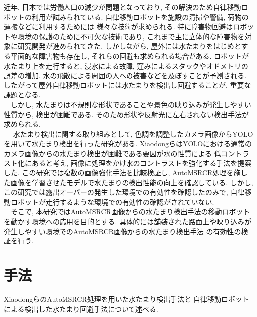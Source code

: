 \documentclass[10pt]{jarticle}
\begin{document}
    近年, 日本では労働人口の減少が問題となっており, 
    その解決のため自律移動ロボットの利用が試みられている. 
    自律移動ロボットを施設の清掃や警備, 荷物の運搬などに利用するためには
    様々な技術が求められる. 
    特に障害物回避はロボットや環境の保護のために不可欠な技術であり, 
    これまで主に立体的な障害物を対象に研究開発が進められてきた\cite{朝田2019}. 
    しかしながら, 屋外には水たまりをはじめとする平面的な障害物も存在し, 
    それらの回避も求められる場合がある. ロボットが水たまり上を走行すると, 
    浸水による故障, 窪みによるスタックやオドメトリの誤差の増加, 
    水の飛散による周囲の人への被害などを及ぼすことが予測される. 
    したがって屋外自律移動ロボットには水たまりを検出し回避することが, 
    重要な課題となる.\\ 
    　しかし, 水たまりは不規則な形状であることや景色の映り込みが発生しやすい性質から, 
    検出が困難である. そのため形状や反射光に左右されない検出手法が求められる.\\
    　 水たまり検出に関する取り組みとして, 
    色調を調整したカメラ画像からYOLOを用いて水たまり検出を行った研究がある. 
    Xiaodongら\cite{Xiaodong2022}はYOLOにおける通常のカメラ画像からの水たまり検出が困難である要因が水の性質による
    低コントラスト化にあると考え, 画像に処理をかけ水のコントラストを強化する手法を提案した. 
    この研究では複数の画像強化手法を比較検証し, 
    AutoMSRCR処理を施した画像を学習させたモデルで水たまりの検出性能の向上を確認している. 
    しかし, この研究では露出オーバーの発生した環境での有効性を確認したのみで, 
    自律移動ロボットが走行するような環境での有効性の確認がされていない.   \\
    　そこで, 本研究ではAutoMSRCR画像からの水たまり検出手法の移動ロボットを動かす環境への応用を目的とする. 
    具体的には舗装された路面上や映り込みが発生しやすい環境でのAutoMSRCR画像からの水たまり検出手法
    の有効性の検証を行う.


    \section{手法}%
        XiaodongらのAutoMSRCR処理を用いた水たまり検出手法と
        自律移動ロボットによる検出した水たまり回避手法について述べる. 
\end{document}
